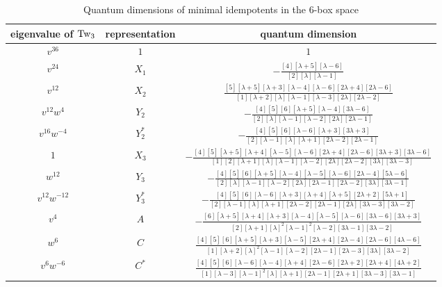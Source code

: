 \documentclass[12pt]{amsart}
\begin{document}
\begin{table}
  \centering
  \begin{tabular}{ccc}
    \toprule
   eigenvalue of $\operatorname{Tw}_3$ & representation & quantum dimension \\
    \midrule
   $v^{36}$        & $1$     & $1$ \\[2pt]
   $v^{24}$        & $X_1$   & $-\frac{[4][\lambda+5][\lambda-6]}{[2][\lambda][\lambda-1]}$ \\[2pt]
   $v^{12}$        & $X_2$   & $\frac{[5][\lambda+5][\lambda+3][\lambda-4][\lambda-6][2\lambda+4][2\lambda-6]}{[1][\lambda+2][\lambda][\lambda-1][\lambda-3][2\lambda][2\lambda-2]}$ \\[2pt]
   $v^{12}w^4$     & $Y_2$   & $-\frac{[4][5][6][\lambda+5][\lambda-4][3\lambda-6]}{[2][\lambda][\lambda-1][\lambda-2][2\lambda][2\lambda-1]}$ \\[2pt]
   $v^{16}w^{-4}$  & $Y_2^*$ & $-\frac{[4][5][6][\lambda-6][\lambda+3][3\lambda+3]}{[2][\lambda-1][\lambda][\lambda+1][2\lambda-2][2\lambda-1]}$ \\[2pt]
   $1$             & $X_3$   & $- \frac{[4][5][\lambda+5][\lambda+4][\lambda-5][\lambda-6][2\lambda+4][2\lambda-6][3\lambda+3][3\lambda-6]}{[1][2][\lambda+1][\lambda][\lambda-1][\lambda-2][2\lambda][2\lambda-2][3\lambda][3\lambda-3]}$ \\[2pt]
   $w^{12}$        & $Y_3$   & $- \frac{[4][5][6][\lambda+5][\lambda-4][\lambda-5][\lambda-6][2\lambda-4][5\lambda-6]}{[2][\lambda][\lambda-1][\lambda-2][2\lambda][2\lambda-1][2\lambda-2][3\lambda][3\lambda-1]}$ \\[2pt]
   $v^{12}w^{-12}$ & $Y_3^*$ & $- \frac{[4][5][6][\lambda-6][\lambda+3][\lambda+4][\lambda+5][2\lambda+2][5\lambda+1]}{[2][\lambda-1][\lambda][\lambda+1][2\lambda-2][2\lambda-1][2\lambda][3\lambda-3][3\lambda-2]}$ \\[2pt]
   $v^4$           & $A$     & $- \frac{[6][\lambda+5][\lambda+4][\lambda+3][\lambda-4][\lambda-5][\lambda-6][3\lambda-6][3\lambda+3]}{[2][\lambda+1][\lambda]^2[\lambda-1]^2[\lambda-2][3\lambda-1][3\lambda-2]}$ \\[2pt]
   $w^6$           & $C$     & $\frac{[4][5][6][\lambda+5][\lambda+3][\lambda-5][2\lambda+4][2\lambda-4][2\lambda-6][4\lambda-6]}{[1][\lambda+2][\lambda]^2[\lambda-1][\lambda-2][2\lambda-1][2\lambda-3][3\lambda][3\lambda-2]}$ \\[2pt]
   $v^6w^{-6}$     & $C^*$   & $\frac{[4][5][6][\lambda-6][\lambda-4][\lambda+4][2\lambda-6][2\lambda+2][2\lambda+4][4\lambda+2]}{[1][\lambda-3][\lambda-1]^2[\lambda][\lambda+1][2\lambda-1][2\lambda+1][3\lambda-3][3\lambda-1]}$ \\ 
    \bottomrule
  \end{tabular}
  \medskip
  \caption{Quantum dimensions of minimal idempotents in the 6-box space}\label{tab:quantum-dimensions}
\end{table}
\end{document}
